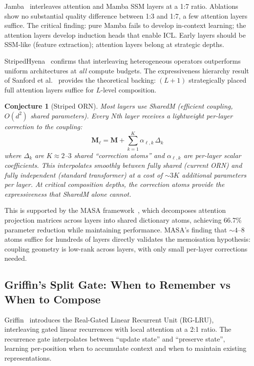 \documentclass[11pt, a4paper]{article}
\newcommand{\M}{\mathbf{M}}
\theoremstyle{plain}
\newtheorem{conjecture}{Conjecture}
\theoremstyle{remark}
\begin{document}
Jamba~\cite{lieber2024jamba} interleaves attention and Mamba SSM layers at a 1:7 ratio.
Ablations show no substantial quality difference between 1:3 and 1:7, a few attention layers suffice.
The critical finding: pure Mamba fails to develop in-context learning; the attention layers develop induction heads that enable ICL.
Early layers should be SSM-like (feature extraction); attention layers belong at strategic depths.

StripedHyena~\cite{poli2025stripedhyena} confirms that interleaving heterogeneous operators outperforms uniform architectures at \emph{all} compute budgets.
The expressiveness hierarchy result of Sanford et al.~\cite{sanford2025provable} provides the theoretical backing: $(L{+}1)$ strategically placed full attention layers suffice for $L$-level composition.

\begin{conjecture}[Striped ORN]
Most layers use SharedM (efficient coupling, $O(d^2)$ shared parameters).
Every $N$th layer receives a lightweight per-layer correction to the coupling:
\begin{equation}
    \M_\ell = \M + \sum_{k=1}^{K} \alpha_{\ell,k} \, \Delta_k
\end{equation}
where $\Delta_k$ are $K \approx 2$--$3$ shared ``correction atoms'' and $\alpha_{\ell,k}$ are per-layer scalar coefficients.
This interpolates smoothly between fully shared (current ORN) and fully independent (standard transformer) at a cost of $\sim 3K$ additional parameters per layer.
At critical composition depths, the correction atoms provide the expressiveness that SharedM alone cannot.
\end{conjecture}

This is supported by the MASA framework~\cite{ji2025masa}, which decomposes attention projection matrices across layers into shared dictionary atoms, achieving 66.7\% parameter reduction while maintaining performance.
MASA's finding that ${\sim}4$--$8$ atoms suffice for hundreds of layers directly validates the memoisation hypothesis: coupling geometry is low-rank across layers, with only small per-layer corrections needed.

\subsection{Griffin's Split Gate: When to Remember vs When to Compose}

Griffin~\cite{de2024griffin} introduces the Real-Gated Linear Recurrent Unit (RG-LRU), interleaving gated linear recurrences with local attention at a 2:1 ratio.
The recurrence gate interpolates between ``update state'' and ``preserve state'', learning per-position when to accumulate context and when to maintain existing representations.
\end{document}
